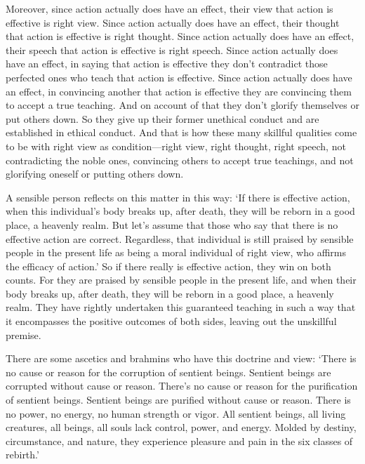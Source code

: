 \documentclass[12pt,openany]{book}%
\begin{document}
Moreover, since action actually does have an effect, their view that action is effective is right view. Since action actually does have an effect, their thought that action is effective is right thought. Since action actually does have an effect, their speech that action is effective is right speech. Since action actually does have an effect, in saying that action is effective they don’t contradict those perfected ones who teach that action is effective. Since action actually does have an effect, in convincing another that action is effective they are convincing them to accept a true teaching. And on account of that they don’t glorify themselves or put others down. So they give up their former unethical conduct and are established in ethical conduct. And that is how these many skillful qualities come to be with right view as condition—right view, right thought, right speech, not contradicting the noble ones, convincing others to accept true teachings, and not glorifying oneself or putting others down. 

A sensible person reflects on this matter in this way: ‘If there is effective action, when this individual’s body breaks up, after death, they will be reborn in a good place, a heavenly realm. But let’s assume that those who say that there is no effective action are correct. Regardless, that individual is still praised by sensible people in the present life as being a moral individual of right view, who affirms the efficacy of action.’ So if there really is effective action, they win on both counts. For they are praised by sensible people in the present life, and when their body breaks up, after death, they will be reborn in a good place, a heavenly realm. They have rightly undertaken this guaranteed teaching in such a way that it encompasses the positive outcomes of both sides, leaving out the unskillful premise. 

There are some ascetics and brahmins who have this doctrine and view: ‘There is no cause or reason for the corruption of sentient beings. Sentient beings are corrupted without cause or reason. There’s no cause or reason for the purification of sentient beings. Sentient beings are purified without cause or reason. There is no power, no energy, no human strength or vigor. All sentient beings, all living creatures, all beings, all souls lack control, power, and energy. Molded by destiny, circumstance, and nature, they experience pleasure and pain in the six classes of rebirth.’ 
\end{document}
